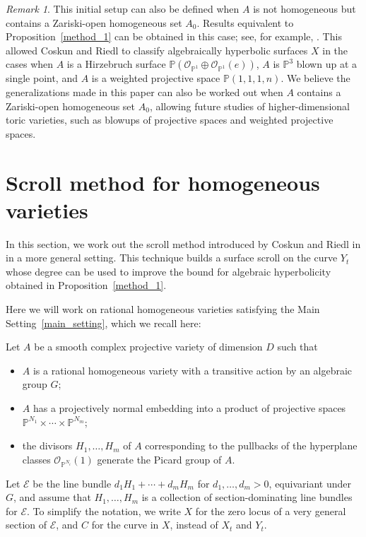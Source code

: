 \documentclass[11pt]{amsart}
\numberwithin{equation}{section}
\theoremstyle{definition}
\theoremstyle{remark}
\newtheorem{remark}[theorem]{Remark}
\newcommand{\cO}{\mathcal{O}}
\renewcommand{\P}{\mathbb{P}}
\begin{document}
\begin{remark}
    This initial setup can also be defined when $A$ is not homogeneous but contains a Zariski-open homogeneous set $A_0$. Results equivalent to Proposition~\ref{method_1} can be obtained in this case; see, for example, \cite[Theorem 1.2]{CR19}. This allowed Coskun and Riedl \cite{CR19} to classify algebraically hyperbolic surfaces $X$ in the cases when $A$ is a Hirzebruch surface $\P(\cO_{\P^1}\oplus \cO_{\P^1}(e))$, $A$ is $\P^3$ blown up at a single point, and $A$ is a weighted projective space $\P(1,1,1,n)$. We believe the generalizations made in this paper can also be worked out when $A$ contains a Zariski-open homogeneous set $A_0$, allowing future studies of higher-dimensional toric varieties, such as blowups of projective spaces and weighted projective spaces.
\end{remark}

\section{Scroll method for homogeneous varieties}\label{sec3}

In this section, we work out the scroll method introduced by Coskun and Riedl in \cite{CR19} in a more general setting. This technique builds a surface scroll on the curve $Y_t$ whose degree can be used to improve the bound for algebraic hyperbolicity obtained in Proposition~\ref{method_1}.

Here we will work on rational homogeneous varieties satisfying the Main Setting~\ref{main_setting}, which we recall here:

 Let $A$ be a smooth complex projective variety of dimension $D$ such that
    \begin{itemize}
        \item $A$ is a rational homogeneous variety with a transitive action by an algebraic group $G$;
        \item $A$ has a projectively normal embedding into a product of projective spaces $\P^{N_1}\times \cdots \times \P^{N_m}$;
        \item the divisors $H_1, \hdots , H_m$ of $A$ corresponding to the pullbacks of the hyperplane classes $\cO_{\P^{N_i}}(1)$ generate the Picard group of $A$.
    \end{itemize}

    Let $\mathcal{E}$ be the line bundle $d_1H_1 + \cdots + d_mH_m$ for $d_1,\hdots ,d_m >0$, equivariant under $G$, and assume that $H_1, \hdots , H_m$ is a collection of section-dominating line bundles for $\mathcal{E}$. To simplify the notation, we write $X$ for the zero locus of a very general section of $\mathcal{E}$, and $C$ for the curve in $X$, instead of $X_t$ and $Y_t$.
    
\end{document}
